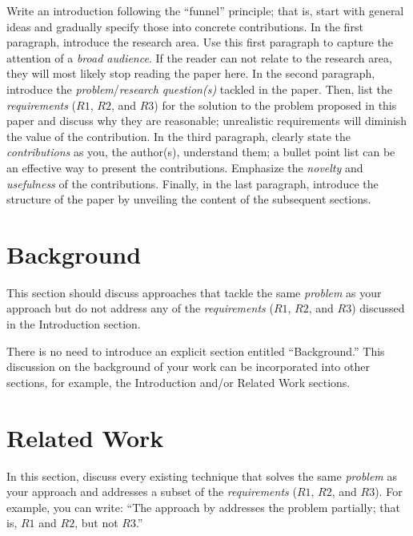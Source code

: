 Write an introduction following the ``funnel'' principle; that is, start with general ideas and gradually specify those into concrete contributions. In the first paragraph, introduce the research area. Use this first paragraph to capture the attention of a \emph{broad audience}. If the reader can not relate to the research area, they will most likely stop reading the paper here. In the second paragraph, introduce the \emph{problem}/\emph{research question(s)} tackled in the paper. Then, list the \emph{requirements} ($R1$, $R2$, and $R3$) for the solution to the problem proposed in this paper and discuss why they are reasonable; unrealistic requirements will diminish the value of the contribution. In the third paragraph, clearly state the \emph{contributions} as you, the author(s), understand them; a bullet point list can be an effective way to present the contributions. Emphasize the \emph{novelty} and \emph{usefulness} of the contributions. Finally, in the last paragraph, introduce the structure of the paper by unveiling the content of the subsequent sections.

\section{Background}
\label{sec:background}

This section should discuss approaches that tackle the same \emph{problem} as your approach but do not address any of the \emph{requirements} ($R1$, $R2$, and $R3$) discussed in the Introduction section.

There is no need to introduce an explicit section entitled ``Background.''
This discussion on the background of your work can be incorporated into other sections, for example, the Introduction and/or Related Work sections.

\section{Related Work}
\label{sec:related:work}

In this section, discuss every existing technique that solves the same \emph{problem} as your approach and addresses a subset of the \emph{requirements} ($R1$, $R2$, and $R3$).
For example, you can write: ``The approach by \citet{PolyvyanyyPQM2022} addresses the problem partially; that is, $R1$ and $R2$, but not $R3$.''

